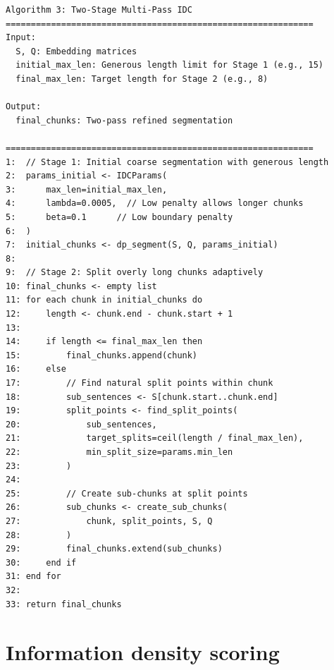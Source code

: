 \documentclass[12pt,a4paper]{report}
\begin{document}
\begin{verbatim}
Algorithm 3: Two-Stage Multi-Pass IDC
=============================================================
Input:
  S, Q: Embedding matrices
  initial_max_len: Generous length limit for Stage 1 (e.g., 15)
  final_max_len: Target length for Stage 2 (e.g., 8)
  
Output:
  final_chunks: Two-pass refined segmentation

=============================================================
1:  // Stage 1: Initial coarse segmentation with generous length
2:  params_initial <- IDCParams(
3:      max_len=initial_max_len,
4:      lambda=0.0005,  // Low penalty allows longer chunks
5:      beta=0.1      // Low boundary penalty
6:  )
7:  initial_chunks <- dp_segment(S, Q, params_initial)
8:  
9:  // Stage 2: Split overly long chunks adaptively
10: final_chunks <- empty list
11: for each chunk in initial_chunks do
12:     length <- chunk.end - chunk.start + 1
13:     
14:     if length <= final_max_len then
15:         final_chunks.append(chunk)
16:     else
17:         // Find natural split points within chunk
18:         sub_sentences <- S[chunk.start..chunk.end]
19:         split_points <- find_split_points(
20:             sub_sentences,
21:             target_splits=ceil(length / final_max_len),
22:             min_split_size=params.min_len
23:         )
24:         
25:         // Create sub-chunks at split points
26:         sub_chunks <- create_sub_chunks(
27:             chunk, split_points, S, Q
28:         )
29:         final_chunks.extend(sub_chunks)
30:     end if
31: end for
32:
33: return final_chunks
\end{verbatim}

\section{Information density scoring}
\end{document}
